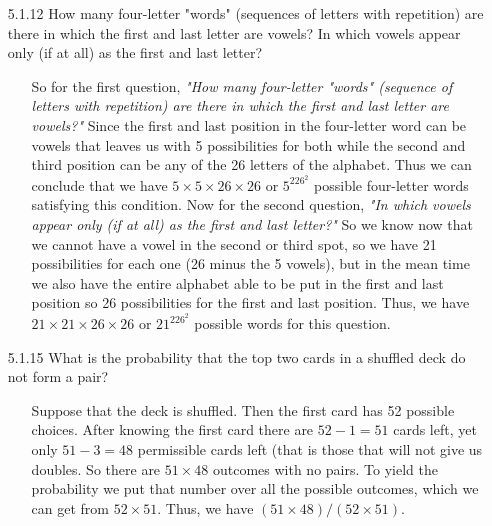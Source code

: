 \documentclass[12pt]{article}
\begin{document}
\begin{enumerate}
\item[5.1.12] How many four-letter "words" (sequences of letters with repetition) are there in which the first and last letter are vowels? In which vowels appear only (if at all) as the first and last letter?
\begin{enumerate}
\item[] So for the first question, \emph{"How many four-letter "words" (sequence of letters with repetition) are
there in which the first and last letter are vowels?"} Since the first and last position in the four-letter word
can be vowels that leaves us with 5 possibilities for both while the second and third position can be any of the
26 letters of the alphabet. Thus we can conclude that we have $5 \times 5 \times 26 \times 26$ or $5^226^2$ possible
four-letter words satisfying this condition. Now for the second question, \emph{"In which vowels appear only (if at 
all) as the first and last letter?"} So we know now that we cannot have a vowel in the second or third spot, so we
have 21 possibilities for each one (26 minus the 5 vowels), but in the mean time we also have the entire alphabet
able to be put in the first and last position so 26 possibilities for the first and last position. Thus, we have
$21 \times 21 \times 26 \times 26$ or $21^226^2$ possible words for this question.
\end{enumerate}

\item[5.1.15] What is the probability that the top two cards in a shuffled deck do not form a pair?
\begin{enumerate}
\item[] Suppose that the deck is shuffled. Then the first card has 52 possible choices. After knowing the first card there are $52 - 1 = 51$ cards left, yet only $51 - 3 = 48$ permissible cards left (that is those that will not give us doubles. So there are $51 \times 48$ outcomes with no pairs. To yield the probability we put that number over all the possible outcomes, which we can get from $52 \times 51$. Thus, we have $(51 \times 48)/(52 \times 51)$.
\end{enumerate}


\end{enumerate}
\end{document}
